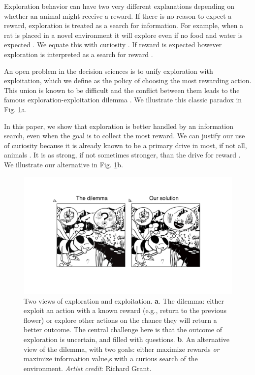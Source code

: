 Exploration behavior can have two very different explanations depending on whether an animal might receive a reward. If there is no reason to expect a reward, exploration is treated as a search for information. For example, when a rat is placed in a novel environment it will explore even if no food and water is expected \cite{Berlyne1950}. We equate this with curiosity \cite{Berlyne1950,Schmidhuber1991,Kidd2015,Jaegle2019,Sumner2019,Wang2019,Auersperg2015}. If reward is expected however exploration is interpreted as a search for reward \cite{Gupta2006,Sutton2018,Woodgate2017,Lee2011a,Schulz2018a,Calhoun2014}.

An open problem in the decision sciences is to unify exploration with exploitation, which we define as the policy of choosing the most rewarding action. This union is known to be difficult and the conflict between them leads to the famous exploration-exploitation dilemma \citep{Kelly1956,Berger-Tal2014,Dayan1996,Thrun1992,Mehlhorn2015,Kobayashi2019}. We illustrate this classic paradox in Fig. \ref{fig:bee}a.

In this paper, we show that exploration is better handled by an information search, even when the goal is to collect the most reward. We can justify our use of curiosity because it is already known to be a primary drive in most, if not all, animals \cite{Berlyne1950,Loewenstein1994,Inglis2001}. It is as strong, if not sometimes stronger, than the drive for reward \cite{Loewenstein1994,Kidd2015,Gottlieb2018,Sumner2019,Gopnik2020,Song2019,Wang2019}. We illustrate our alternative in Fig. \ref{fig:bee}b.

\begin{figure}
	\begin{fullwidth}
	\includegraphics[width=.55\linewidth]{img/bee.pdf} 
	\caption{Two views of exploration and exploitation. \textbf{a}. The dilemma: either exploit an action with a known reward (e.g., return to the previous flower) or explore other actions on the chance they will return a better outcome. The central challenge here is that the outcome of exploration is uncertain, and filled with questions. \textbf{b}. An alternative view of the dilemma, with two goals: either maximize rewards \textit{or} maximize information value,s with a curious search of the environment. \textit{Artist credit}: Richard Grant.}
	\label{fig:bee} 
	\end{fullwidth}
\end{figure}

